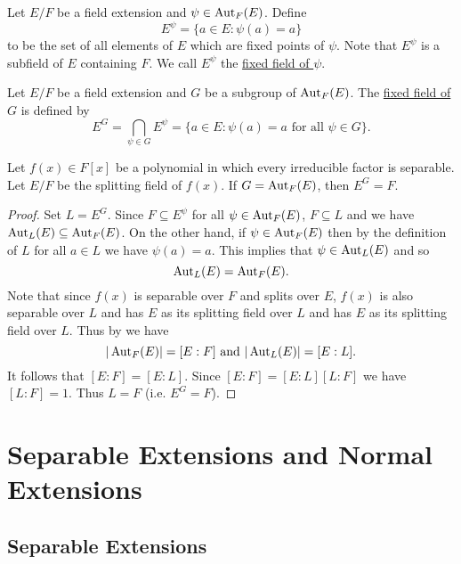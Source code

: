 \documentclass[11pt]{article}
\begin{document}
\begin{definition}
    Let $E/F$ be a field extension and $\psi\in\operatorname{Aut}_F(E)$. Define
    \[E^\psi=\{a\in E:\psi(a)=a\}\]
    to be the set of all elements of $E$ which are fixed points of $\psi$. Note that $E^\psi$ is a subfield of $E$ containing $F$. We call $E^\psi$ the \ul{fixed field of $\psi$}.
\end{definition}

\begin{definition}
    Let $E/F$ be a field extension and $G$ be a subgroup of $\operatorname{Aut}_F(E)$. The \ul{fixed field of $G$} is defined by
    \[E^G=\bigcap\limits_{\psi\in G}E^{\psi}=\{a\in E:\psi(a)=a\text{ for all }\psi\in G\}.\]
\end{definition}

\begin{theorem}
    Let $f(x)\in F[x]$ be a polynomial in which every irreducible factor is separable. Let $E/F$ be the splitting field of $f(x)$. If $G=\operatorname{Aut}_F(E)$, then $E^G=F$.
\end{theorem}

\begin{proof}
    Set $L=E^G$. Since $F\subseteq E^\psi$ for all $\psi\in\operatorname{Aut}_F(E)$, $F\subseteq L$ and we have $\operatorname{Aut}_L(E)\subseteq\operatorname{Aut}_F(E)$.
    On the other hand, if $\psi\in\operatorname{Aut}_F(E)$ then by the definition of $L$ for all $a\in L$ we have $\psi(a)=a$. This implies that $\psi\in\operatorname{Aut}_L(E)$ and so
    \[\operatorname{Aut}_L(E)=\operatorname{Aut}_F(E).\]
    Note that since $f(x)$ is separable over $F$ and splits over $E$, $f(x)$ is also separable over $L$ and has $E$ as its splitting field over $L$ and has $E$ as its splitting field over $L$. Thus by  we have
    \[|\operatorname{Aut}_F(E)|=[E:F]\text{ and }|\operatorname{Aut}_L(E)|=[E:L].\]
    It follows that $[E:F]=[E:L]$. Since $[E:F]=[E:L][L:F]$ we have $[L:F]=1$. Thus $L=F$ (i.e. $E^G=F$).
    
\end{proof}

\pagebreak

\section{Separable Extensions and Normal Extensions}

\subsection{Separable Extensions}
\end{document}
